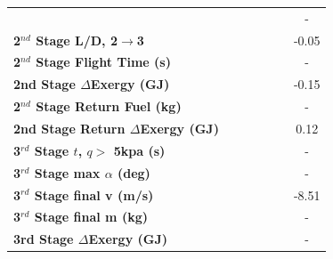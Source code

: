 \begin{table}[ht]
\begin{tabular}{l c c c c c c}
	& \secondthirdSeparationqCdNinety
	& \secondthirdSeparationqCdNinetyFive
	& \secondthirdSeparationqCdStandard
	& \secondthirdSeparationqCdOneHundredFive
	& \secondthirdSeparationqCdOneHundredTen
	& -
	\\
	\textbf{2$^{nd}$ Stage L/D, 2$\rightarrow$3}
	& \secondthirdSeparationLDCdNinety
	& \secondthirdSeparationLDCdNinetyFive
	& \secondthirdSeparationLDCdStandard
	& \secondthirdSeparationLDCdOneHundredFive
	& \secondthirdSeparationLDCdOneHundredTen
	&-0.05
	\\
	\textbf{2$^{nd}$ Stage Flight Time (s)}
	& \secondFlightTimeCdNinety
	& \secondFlightTimeCdNinetyFive
	& \secondFlightTimeCdStandard
	& \secondFlightTimeCdOneHundredFive
	& \secondFlightTimeCdOneHundredTen
	& -
	\\
	\textbf{2nd Stage $\Delta$Exergy (GJ)}
	& \seconddExergyCdNinety
	& \seconddExergyCdNinetyFive
	& \seconddExergyCdStandard
	& \seconddExergyCdOneHundredFive
	& \seconddExergyCdOneHundredTen
	&-0.15
	\\
	\textbf{2$^{nd}$ Stage Return Fuel (kg)}
	& \returnFuelCdNinety
	& \returnFuelCdNinetyFive
	& \returnFuelCdStandard
	& \returnFuelCdOneHundredFive
	& \returnFuelCdOneHundredTen
	& -
	\\
	\textbf{2nd Stage Return $\Delta$Exergy (GJ)}
	& \returndExergyCdNinety
	& \returndExergyCdNinetyFive
	& \returndExergyCdStandard
	& \returndExergyCdOneHundredFive
	& \returndExergyCdOneHundredTen
	&0.12
	\\
	\textbf{3$^{rd}$ Stage $t$, $q >$ 5kpa (s)}
	& \thirdqOverFiveCdNinety
	& \thirdqOverFiveCdNinetyFive
	& \thirdqOverFiveCdStandard
	& \thirdqOverFiveCdOneHundredFive
	& \thirdqOverFiveCdOneHundredTen
	& -
	\\
	\textbf{3$^{rd}$ Stage max $\alpha$ (deg)}
	& \thirdmaxAoACdNinety
	& \thirdmaxAoACdNinetyFive
	& \thirdmaxAoACdStandard
	& \thirdmaxAoACdOneHundredFive
	& \thirdmaxAoACdOneHundredTen
	& -
	\\
	\textbf{3$^{rd}$ Stage final v (m/s)}
	& \thirdcircvCdNinety
	& \thirdcircvCdNinetyFive
	& \thirdcircvCdStandard
	& \thirdcircvCdOneHundredFive
	& \thirdcircvCdOneHundredTen
	&-8.51
	\\
	\textbf{3$^{rd}$ Stage final m (kg)}
	& \thirdcircmCdNinety
	& \thirdcircmCdNinetyFive
	& \thirdcircmCdStandard
	& \thirdcircmCdOneHundredFive
	& \thirdcircmCdOneHundredTen
	& -
	\\
	\textbf{3rd Stage $\Delta$Exergy (GJ)}
	& \thirddExergyCdNinety
	& \thirddExergyCdNinetyFive
	& \thirddExergyCdStandard
	& \thirddExergyCdOneHundredFive
	& \thirddExergyCdOneHundredTen
	& -
	\\
	\hline 
\end{tabular} 
\end{table}


